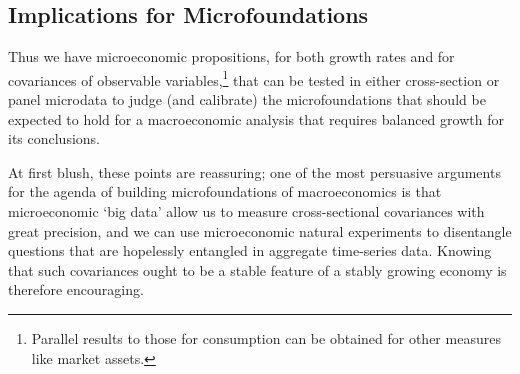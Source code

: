 \documentclass[BufferStockTheory]{subfiles}
\begin{document}
\begin{comment}
  which is the point where $\HarmWide{\cv}_{t}$ is the covariance calculated according to the Harmenberg measure.

  As Harmenberg points out, a convenient feature of his measure is that $\Harm{\Mean}_{t+n}[\pLevBF_{t+n}]=\PGro^{n}$.  Using this, if by date $t=0$ the economy had achieved a Harmenberg-invariant state then we could define $\cRatAvg=\Harm{\Mean}_{t}[\cRat_ {t}]$ and use the fact that thereafter assets grow at the constant rate $\PGro$ to obtain
  \begin{equation}
    \begin{split}\label{eq:covProblem} 
      \CLevBF_{t+1} & = \PGro \CLevBF_{t}\notag \\ 
      \cRatAvg\PGro +\HarmWide{\cv}(\cRat_{t+1},\pLevBF_{t+1})   & = \PGro \left( \cRatAvg    +  \HarmWide{\cv}(\cRat_{t},\pLevBF_{t})\right) 
      \\  \HarmWide{\cv}(\cRat_{t+1},\pLevBF_{t+1})   & = \HarmWide{\cv}(\cRat_{t},\pLevBF_{t})  \notag
    \end{split}
  \end{equation}

  A corresponding argument shows that $\cov(\mRat,\pLevBF)$ also grows by $\PGro$.
\end{comment}


\hypertarget{microfounding-macro-needs-ergodicity}{}
\subsection{Implications for Microfoundations}\label{subsec:Covariances}

Thus we have microeconomic propositions, for both growth rates and for covariances of observable variables,\footnote{Parallel results to those for consumption can be obtained for other measures like market assets.} that can be tested in either cross-section or panel microdata to judge (and calibrate) the microfoundations that should be expected to hold for a macroeconomic analysis that requires balanced growth for its conclusions.  

At first blush, these points are reassuring; one of the most persuasive arguments for the agenda of building microfoundations of macroeconomics is that microeconomic `big data' allow us to measure cross-sectional covariances with great precision, and we can use microeconomic natural experiments to disentangle questions that are hopelessly entangled in aggregate time-series data.  Knowing that such covariances ought to be a stable feature of a stably growing economy is therefore encouraging.
\end{document}
